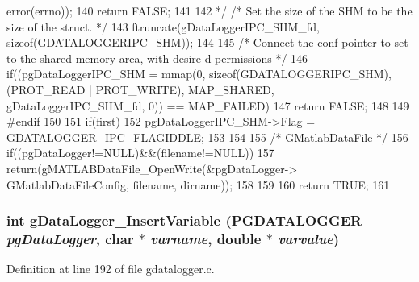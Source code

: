 \begin{DoxyCode}
{{      error(errno));
140                 return FALSE;
141         } 
142 */      /* Set the size of the SHM to be the size of the struct. */
143         ftruncate(gDataLoggerIPC_SHM_fd, sizeof(GDATALOGGERIPC_SHM));
144 
145         /* Connect the conf pointer to set to the shared memory area, with desire
      d permissions */
146         if((pgDataLoggerIPC_SHM =  mmap(0, sizeof(GDATALOGGERIPC_SHM), (PROT_READ
       | PROT_WRITE), MAP_SHARED, gDataLoggerIPC_SHM_fd, 0)) == MAP_FAILED) {
147                 return FALSE;
148         }
149 #endif
150         
151         if(first){
152                 pgDataLoggerIPC_SHM->Flag = GDATALOGGER_IPC_FLAGIDDLE;
153         }
154 
155         /* GMatlabDataFile */
156         if((pgDataLogger!=NULL)&&(filename!=NULL)){
157                 return(gMATLABDataFile_OpenWrite(&pgDataLogger->
      GMatlabDataFileConfig, filename, dirname));
158         }
159         
160         return TRUE;
161 }
\end{DoxyCode}
\subsubsection[{gDataLogger\_\-InsertVariable}]{\setlength{\rightskip}{0pt plus 5cm}int gDataLogger\_\-InsertVariable ({\bf PGDATALOGGER} {\em pgDataLogger}, \/  char $\ast$ {\em varname}, \/  double $\ast$ {\em varvalue})}\label{gdatalogger_8h_a32674e7c2afa8b78e99a0070cf4bcaf9}


Definition at line 192 of file gdatalogger.c.


